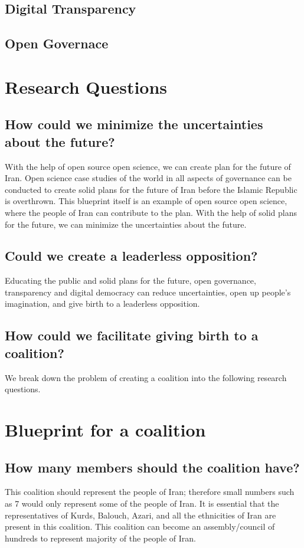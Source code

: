 \documentclass{IEEEtran}
\begin{document}
\subsection{Digital Transparency}

\subsection{Open Governace} 


\section{Research Questions}

\subsection{How could we minimize the uncertainties about the future?}

With the help of open source open science, we can create plan for the future of Iran.
Open science case studies of the world in all aspects of governance can be conducted to create solid plans for the future of Iran before the Islamic Republic is overthrown.
This blueprint itself is an example of open source open science, where the people of Iran can contribute to the plan.
With the help of solid plans for the future, we can minimize the uncertainties about the future.

\subsection{Could we create a leaderless opposition?}
Educating the public and solid plans for the future,
open governance, transparency and digital democracy can reduce
uncertainties, open up people’s imagination, and give birth to a
leaderless opposition.

\subsection{How could we facilitate giving birth to a coalition?}

We break down the problem of creating a coalition into the following research questions.


\section{Blueprint for a coalition}
\subsection{How many members should the coalition have?}
This coalition should represent the people of Iran; therefore small numbers such as 7 would only represent some of the people of Iran. 
It is essential that the representatives of Kurds, Balouch, Azari, and all the ethnicities of Iran are present in this coalition. This coalition can become an assembly/council of hundreds to represent majority of the people of Iran. 
\end{document}
